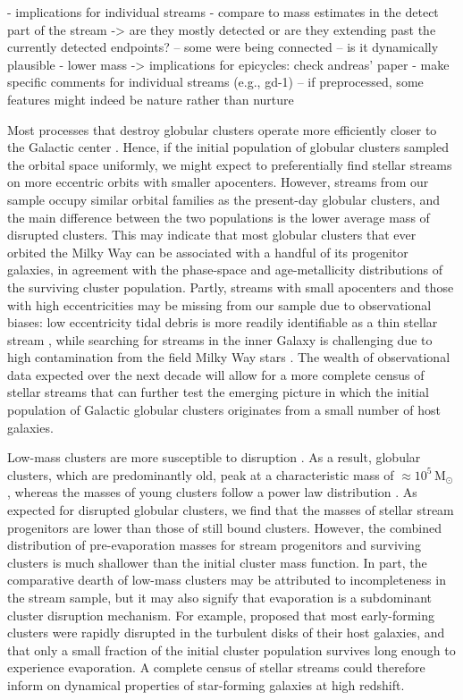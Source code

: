 \documentclass[twocolumn]{aastex63}
\newcommand{\msun}{\ensuremath{\textrm{M}_\odot}}
\begin{document}
- implications for individual streams
- compare to mass estimates in the detect part of the stream -> are they mostly detected or are they extending past the currently detected endpoints? -- some were being connected -- is it dynamically plausible
- lower mass -> implications for epicycles: check andreas' paper
- make specific comments for individual streams (e.g., gd-1)
-- if preprocessed, some features might indeed be nature rather than nurture

Most processes that destroy globular clusters operate more efficiently closer to the Galactic center \citep[e.g.,][]{gnedin:1997}.
Hence, if the initial population of globular clusters sampled the orbital space uniformly, we might expect to preferentially find stellar streams on more eccentric orbits with smaller apocenters.
However, streams from our sample occupy similar orbital families as the present-day globular clusters, and the main difference between the two populations is the lower average mass of disrupted clusters.
This may indicate that most globular clusters that ever orbited the Milky Way can be associated with a handful of its progenitor galaxies, in agreement with the phase-space \citep{massari:2019} and age-metallicity \citep{kruijssen19e} distributions of the surviving cluster population.
Partly, streams with small apocenters and those with high eccentricities may be missing from our sample due to observational biases: low eccentricity tidal debris is more readily identifiable as a thin stellar stream \citep{hendel:2015}, while searching for streams in the inner Galaxy is challenging due to high contamination from the field Milky Way stars \citep[e.g.,][]{ibata:2019}.
The wealth of observational data expected over the next decade will allow for a more complete census of stellar streams that can further test the emerging picture in which the initial population of Galactic globular clusters originates from a small number of host galaxies.

Low-mass clusters are more susceptible to disruption \citep[e.g.,][]{fall:2001}.
As a result, globular clusters, which are predominantly old, peak at a characteristic mass of $\approx10^5\,\msun$ \citep[e.g.,][]{harris:1991}, whereas the masses of young clusters follow a power law distribution \citep[e.g.,][]{zhang:1999}.
As expected for disrupted globular clusters, we find that the masses of stellar stream progenitors are lower than those of still bound clusters.
However, the combined distribution of pre-evaporation masses for stream progenitors and surviving clusters is much shallower than the initial cluster mass function.
In part, the comparative dearth of low-mass clusters may be attributed to incompleteness in the stream sample, but it may also signify that evaporation is a subdominant cluster disruption mechanism.
For example, \citet{kruijssen15b} proposed that most early-forming clusters were rapidly disrupted in the turbulent disks of their host galaxies, and that only a small fraction of the initial cluster population survives long enough to experience evaporation.
A complete census of stellar streams could therefore inform on dynamical properties of star-forming galaxies at high redshift.
\end{document}
